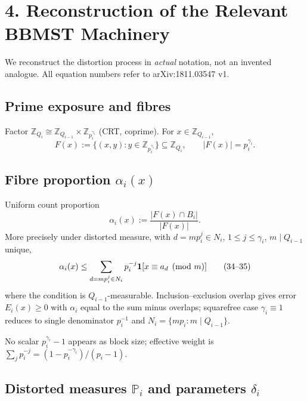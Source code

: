 \documentclass[11pt,a4paper]{article}
\theoremstyle{plain}
\theoremstyle{definition}
\theoremstyle{remark}
\newcommand{\Z}{\mathbb{Z}}
\newcommand{\PP}{\mathbb{P}}
\begin{document}
\section{4. Reconstruction of the Relevant BBMST Machinery}

We reconstruct the distortion process in \emph{actual} notation, not an invented analogue. All equation numbers refer to arXiv:1811.03547 v1.

\subsection{Prime exposure and fibres}

Factor $\Z_{Q_{i}}\cong\Z_{Q_{i-1}}\times\Z_{p_{i}^{\gamma_{i}}}$ (CRT, coprime). For $x\in\Z_{Q_{i-1}}$,
\[
F(x):=\{(x,y):y\in\Z_{p_{i}^{\gamma_{i}}}\}\subseteq\Z_{Q_{i}},\qquad|F(x)|=p_{i}^{\gamma_{i}}.
\]

\subsection{Fibre proportion \texorpdfstring{$\alpha_{i}(x)$}{alpha\_i(x)}}

Uniform count proportion
\[
\alpha_{i}(x):=\frac{|F(x)\cap B_{i}|}{|F(x)|}.
\]
More precisely under distorted measure, with $d=mp_{i}^{j}\in N_{i}$, $1\le j\le\gamma_{i}$, $m\mid Q_{i-1}$ unique,
\[
\alpha_{i}(x)\le\sum_{d=mp_{i}^{j}\in N_{i}}p_{i}^{-j}{\bf1}[x\equiv a_{d}\pmod m]\tag{34--35}
\]
where the condition is $Q_{i-1}$-measurable. Inclusion--exclusion overlap gives error $E_{i}(x)\ge0$ with $\alpha_{i}$ equal to the sum minus overlaps; squarefree case $\gamma_{i}\equiv1$ reduces to single denominator $p_{i}^{-1}$ and $N_{i}=\{mp_{i}:m\mid Q_{i-1}\}$.

No scalar $p_{i}^{\gamma_{i}}-1$ appears as block size; effective weight is $\sum_{j}p_{i}^{-j}=(1-p_{i}^{-\gamma_{i}})/(p_{i}-1)$.

\subsection{Distorted measures \texorpdfstring{$\PP_{i}$}{P\_i} and parameters \texorpdfstring{$\delta_{i}$}{delta\_i}}
\end{document}
